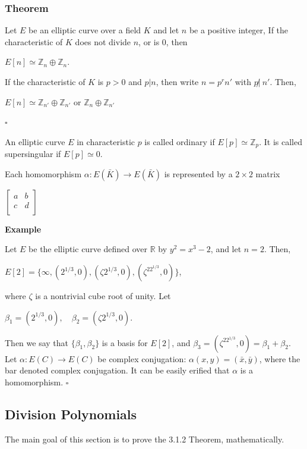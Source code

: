\documentclass[a4paper, 12pt]{article}
\begin{document}
\subsubsection{Theorem}
Let $E$ be an elliptic curve over a field $K$ and let $n$ be a positive integer, If the characteristic of $K$ does not divide $n$, or is 0, then
\begin{center} $E[n] \simeq \mathbb{Z}_n \oplus \mathbb{Z}_n.$ \end{center}
If the characteristic of $K$ is $p > 0$ and $p | n$, then write $n = p^rn'$ with $p\not | \:n'$. Then,
\begin{center} 
$E[n] \simeq \mathbb{Z}_{n'} \oplus \mathbb{Z}_{n'}$ \quad or \quad $\mathbb{Z}_n \oplus \mathbb{Z}_{n'}$
\end{center}
$\square$\par
An elliptic curve $E$ in characteristic $p$ is called ordinary if $E[p] \simeq \mathbb{Z}_{p}$. It is called supersingular if $E[p] \simeq 0.$\par
Each homomorphism $\alpha: E(\bar{K}) \rightarrow E(\bar{K})$ is represented by a $2 \times 2$ matrix
\begin{center} 
	$\begin{bmatrix} 
	a & b \\
	c & d\\
	\end{bmatrix}$
\end{center}
\textbf{Example} \par
Let $E$ be the elliptic curve defined over $\mathbb{R}$ by $y^2=x^3-2$, and let $n=2$. Then, 
\begin{center} $E[2] = \{\infty, (2^{1/3}, 0), (\zeta2^{1/3}, 0), (\zeta^22^{1/3}, 0)\}$, \end{center}
where $\zeta$ is a nontrivial cube root of unity. Let
\begin{center} $\beta_1 = (2^{1/3}, 0), \quad \beta_2=(\zeta2^{1/3}, 0).$ \end{center}
Then we say that $\{\beta_1,\beta_2\}$ is a basis for $E[2]$, and $\beta_3 = (\zeta^22^{1/3}, 0) = \beta_1+\beta_2$.\newline
Let $\alpha: E(C) \longrightarrow E(C)$ be complex conjugation: $\alpha(x,y) = (\bar{x},\bar{y})$, where the bar denoted complex conjugation. It can be easily erified that $\alpha$ is a homomorphism. $\square$
\subsection {Division Polynomials}
The main goal of this section is to prove the 3.1.2 Theorem, mathematically.
\end{document}
